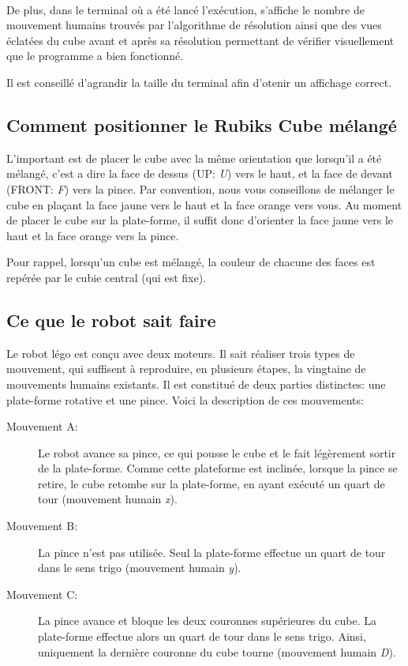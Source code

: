 \documentclass[a4paper,12pt]{article}
\begin{document}
~


De plus, dans le terminal où a été lancé l'exécution, s'affiche le nombre de mouvement humains trouvés par l'algorithme de résolution ainsi que des vues éclatées du cube avant et après sa résolution permettant de vérifier visuellement que le programme a bien fonctionné.

Il est conseillé d'agrandir la taille du terminal afin d'otenir un affichage correct.

\subsection{Comment positionner le Rubiks Cube mélangé}

L'important est de placer le cube avec la même orientation que lorsqu'il a été mélangé, c'est a dire la face de dessus (UP: \textit{U}) vers le haut, et la face de devant (FRONT: \textit{F}) vers la pince.
Par convention, nous vous conseillons de mélanger le cube en plaçant la face jaune vers le haut et la face orange vers vous.
Au moment de placer le cube sur la plate-forme, il suffit donc d'orienter la face jaune vers le haut et la face orange vers la pince.

Pour rappel, lorsqu'un cube est mélangé, la couleur de chacune des faces est repérée par le cubie central (qui est fixe).


\subsection{Ce que le robot sait faire}

Le robot légo est conçu avec deux moteurs. Il sait réaliser trois types de mouvement, qui suffisent à reproduire, en plusieurs étapes, la vingtaine de mouvements humains existants.
Il est constitué de deux parties distinctes: une plate-forme rotative et une pince. Voici la description de ces mouvements:

\begin{description}

 \item[Mouvement A: ] Le robot avance sa pince, ce qui pousse le cube et le fait légèrement sortir de la plate-forme. Comme cette plateforme est inclinée, lorsque la pince se retire, le cube retombe sur la plate-forme, en ayant exécuté un quart de tour (mouvement humain \textit{x}).
 
 \item[Mouvement B: ] La pince n'est pas utilisée. Seul la plate-forme effectue un quart de tour dans le sens trigo (mouvement humain \textit{y}).

 \item[Mouvement C: ] La pince avance et bloque les deux couronnes supérieures du cube. La plate-forme effectue alors un quart de tour dans le sens trigo. Ainsi, uniquement la dernière couronne du cube tourne (mouvement humain \textit{D}).

\end{description}
\end{document}
